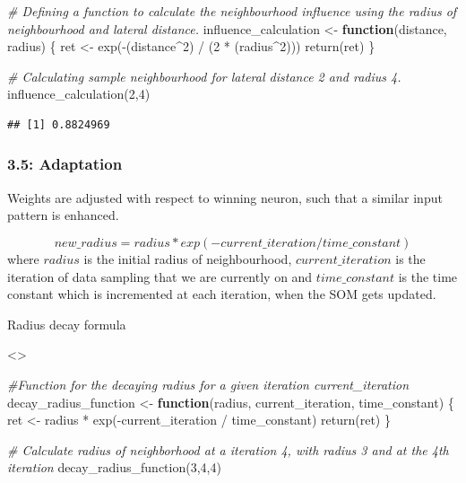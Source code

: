 \documentclass[
]{article}
\newenvironment{Shaded}{\begin{snugshade}}{\end{snugshade}}
\newcommand{\CommentTok}[1]{\textcolor[rgb]{0.56,0.35,0.01}{\textit{#1}}}
\newcommand{\ControlFlowTok}[1]{\textcolor[rgb]{0.13,0.29,0.53}{\textbf{#1}}}
\newcommand{\DecValTok}[1]{\textcolor[rgb]{0.00,0.00,0.81}{#1}}
\newcommand{\FunctionTok}[1]{\textcolor[rgb]{0.00,0.00,0.00}{#1}}
\newcommand{\NormalTok}[1]{#1}
\newcommand{\OtherTok}[1]{\textcolor[rgb]{0.56,0.35,0.01}{#1}}
\newcommand{\SpecialCharTok}[1]{\textcolor[rgb]{0.00,0.00,0.00}{#1}}
\begin{document}
\begin{Shaded}
\begin{Highlighting}[]
\CommentTok{\# Defining a function to calculate the neighbourhood influence using the radius of neighbourhood and lateral distance.}
\NormalTok{influence\_calculation }\OtherTok{\textless{}{-}} \ControlFlowTok{function}\NormalTok{(distance, radius) \{}
\NormalTok{  ret }\OtherTok{\textless{}{-}} \FunctionTok{exp}\NormalTok{(}\SpecialCharTok{{-}}\NormalTok{(distance}\SpecialCharTok{\^{}}\DecValTok{2}\NormalTok{) }\SpecialCharTok{/}\NormalTok{ (}\DecValTok{2} \SpecialCharTok{*}\NormalTok{ (radius}\SpecialCharTok{\^{}}\DecValTok{2}\NormalTok{)))}
  \FunctionTok{return}\NormalTok{(ret)}
\NormalTok{\}}

\CommentTok{\# Calculating sample neighbourhood for lateral distance 2 and radius 4.}
\FunctionTok{influence\_calculation}\NormalTok{(}\DecValTok{2}\NormalTok{,}\DecValTok{4}\NormalTok{)}
\end{Highlighting}
\end{Shaded}

\begin{verbatim}
## [1] 0.8824969
\end{verbatim}

\hypertarget{adaptation}{%
\subsubsection{3.5: Adaptation}\label{adaptation}}

Weights are adjusted with respect to winning neuron, such that a similar
input pattern is enhanced.

\begin{equation}
 new\_radius = radius * exp(-current\_iteration / time\_constant) 
 \end{equation} where \(radius\) is the initial radius of neighbourhood,
\(current\_iteration\) is the iteration of data sampling that we are
currently on and \(time\_constant\) is the time constant which is
incremented at each iteration, when the SOM gets updated.

Radius decay formula

\textless{}\body\textgreater{}

\begin{Shaded}
\begin{Highlighting}[]
\CommentTok{\#Function for the decaying radius for a given iteration current\_iteration}
\NormalTok{decay\_radius\_function }\OtherTok{\textless{}{-}} \ControlFlowTok{function}\NormalTok{(radius, current\_iteration, time\_constant) \{}
\NormalTok{  ret }\OtherTok{\textless{}{-}}\NormalTok{ radius }\SpecialCharTok{*} \FunctionTok{exp}\NormalTok{(}\SpecialCharTok{{-}}\NormalTok{current\_iteration }\SpecialCharTok{/}\NormalTok{ time\_constant)}
  \FunctionTok{return}\NormalTok{(ret)}
\NormalTok{\}}

\CommentTok{\# Calculate radius of neighborhood at a iteration 4, with radius 3 and at the 4th iteration}
\FunctionTok{decay\_radius\_function}\NormalTok{(}\DecValTok{3}\NormalTok{,}\DecValTok{4}\NormalTok{,}\DecValTok{4}\NormalTok{)}
\end{Highlighting}
\end{Shaded}
\end{document}
